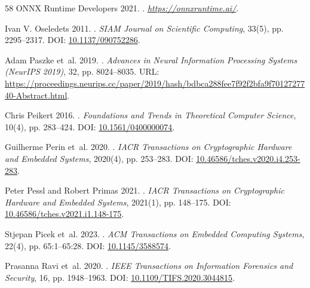\documentclass[letterpaper]{article}
\begin{document}
\begin{thebibliography}{58}
{ONNX Runtime Developers} 2021.
.
\newblock \emph{\url{https://onnxruntime.ai/}}.

Ivan V. Oseledets 2011.
.
\newblock \emph{SIAM Journal on Scientific Computing}, 33(5), pp. 2295--2317.
\newblock DOI: \href{https://doi.org/10.1137/090752286}{10.1137/090752286}.

Adam Paszke et~al. 2019.
.
\newblock \emph{Advances in Neural Information Processing Systems (NeurIPS 2019)}, 32, pp. 8024--8035.
\newblock URL: \url{https://proceedings.neurips.cc/paper/2019/hash/bdbca288fee7f92f2bfa9f7012727740-Abstract.html}.

Chris Peikert 2016.
.
\newblock \emph{Foundations and Trends in Theoretical Computer Science}, 10(4), pp. 283--424.
\newblock DOI: \href{https://doi.org/10.1561/0400000074}{10.1561/0400000074}.

Guilherme Perin et~al. 2020.
.
\newblock \emph{IACR Transactions on Cryptographic Hardware and Embedded Systems}, 2020(4), pp. 253--283.
\newblock DOI: \href{https://doi.org/10.46586/tches.v2020.i4.253-283}{10.46586/tches.v2020.i4.253-283}.

Peter Pessl and Robert Primas 2021.
.
\newblock \emph{IACR Transactions on Cryptographic Hardware and Embedded Systems}, 2021(1), pp. 148--175.
\newblock DOI: \href{https://doi.org/10.46586/tches.v2021.i1.148-175}{10.46586/tches.v2021.i1.148-175}.

Stjepan Picek et~al. 2023.
.
\newblock \emph{ACM Transactions on Embedded Computing Systems}, 22(4), pp. 65:1--65:28.
\newblock DOI: \href{https://doi.org/10.1145/3588574}{10.1145/3588574}.

Prasanna Ravi et~al. 2020.
.
\newblock \emph{IEEE Transactions on Information Forensics and Security}, 16, pp. 1948--1963.
\newblock DOI: \href{https://doi.org/10.1109/TIFS.2020.3044815}{10.1109/TIFS.2020.3044815}.


\end{thebibliography}
\end{document}
